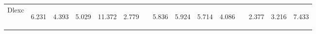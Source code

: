 \begin{center}
\begin{tabular}{lcccccccccccccc}
\noalign{\smallskip}Dlexc & \begin{normalsize}6.231\end{normalsize} & \begin{normalsize}4.393\end{normalsize} & \begin{normalsize}5.029\end{normalsize} & \begin{normalsize}11.372\end{normalsize} & \begin{normalsize}2.779\end{normalsize} & \begin{normalsize}\end{normalsize} & \begin{normalsize}5.836\end{normalsize} & \begin{normalsize}5.924\end{normalsize} & \begin{normalsize}5.714\end{normalsize} & \begin{normalsize}4.086\end{normalsize} & \begin{normalsize}\end{normalsize} & \begin{normalsize}2.377\end{normalsize} & \begin{normalsize}3.216\end{normalsize} & \begin{normalsize}7.433\end{normalsize}\\

\end{tabular}
\end{center}
